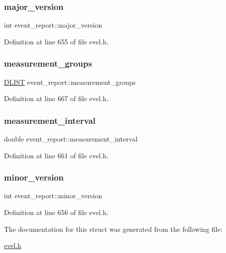\subsubsection{\texorpdfstring{major\+\_\+version}{major\_version}}
{\footnotesize\ttfamily int event\+\_\+report\+::major\+\_\+version}



Definition at line 655 of file evel.\+h.

\hypertarget{structevent__report_a1b6ed94783d22c55051a4d52eebb7686}{}\label{structevent__report_a1b6ed94783d22c55051a4d52eebb7686} 
\subsubsection{\texorpdfstring{measurement\+\_\+groups}{measurement\_groups}}
{\footnotesize\ttfamily \hyperlink{double__list_8h_a45f4a129042d9e1aa4ffd31fe13e4d14}{D\+L\+I\+ST} event\+\_\+report\+::measurement\+\_\+groups}



Definition at line 667 of file evel.\+h.

\hypertarget{structevent__report_add26cd9f3bbc2c88cd0ff774bfa3c9cd}{}\label{structevent__report_add26cd9f3bbc2c88cd0ff774bfa3c9cd} 
\subsubsection{\texorpdfstring{measurement\+\_\+interval}{measurement\_interval}}
{\footnotesize\ttfamily double event\+\_\+report\+::measurement\+\_\+interval}



Definition at line 661 of file evel.\+h.

\hypertarget{structevent__report_ae7de42df0d911b0f10914ede2aa3f2a6}{}\label{structevent__report_ae7de42df0d911b0f10914ede2aa3f2a6} 
\subsubsection{\texorpdfstring{minor\+\_\+version}{minor\_version}}
{\footnotesize\ttfamily int event\+\_\+report\+::minor\+\_\+version}



Definition at line 656 of file evel.\+h.



The documentation for this struct was generated from the following file\+:\begin{DoxyCompactItemize}
\item 
\hyperlink{evel_8h}{evel.\+h}\end{DoxyCompactItemize}
